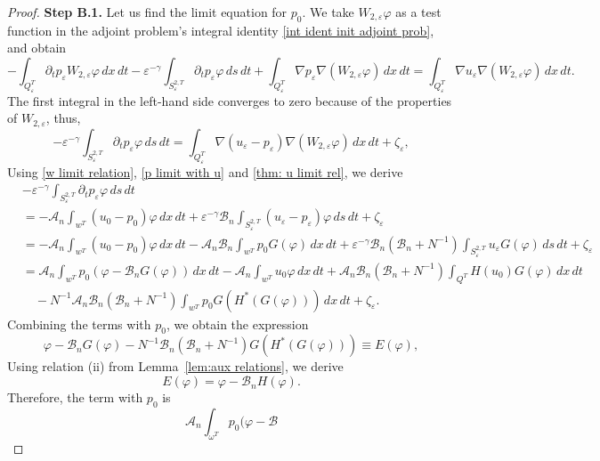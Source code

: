 \documentclass[10pt,a4paper]{amsart}
\numberwithin{equation}{section}
\begin{document}
\begin{proof}
\noindent\textbf{Step B.1.}
Let us find the limit equation for $p_0$. We take 
$W_{2,\varepsilon }\varphi $ as a test function in the adjoint problem's
integral identity \eqref{int ident init adjoint prob}, and obtain
\[
-\int _{Q_{\varepsilon }^{T}}\partial _{t}p_{\varepsilon
}W_{2,\varepsilon }\varphi \,dx\,dt-\varepsilon ^{-\gamma }\int
_{S_{\varepsilon }^{2,T}}\partial _{t}p_{\varepsilon }\varphi \,ds\,dt%
+\int _{Q_{\varepsilon }^{T}}\nabla p_{\varepsilon }\nabla
(W_{2,\varepsilon }\varphi )\,dx\,dt=\int _{Q_{\varepsilon }^{T}}\nabla
u_{\varepsilon }\nabla (W_{2,\varepsilon }\varphi )\,dx\,dt.
\]%
The first integral in the left-hand side converges to zero because of the
properties of $W_{2,\varepsilon }$, thus,
\[
-\varepsilon ^{-\gamma }\int _{S_{\varepsilon }^{2,T}}\partial
_{t}p_{\varepsilon }\varphi \,ds\,dt=\int _{Q_{\varepsilon }^{T}}\nabla
(u_{\varepsilon }-p_{\varepsilon })\nabla (W_{2,\varepsilon }\varphi )\,dx\,dt%
+\zeta _{\varepsilon },
\]
Using \eqref{w limit relation}, \eqref{p limit with u} and
\eqref{thm: u limit rel}, we derive
\begin{align*}
&-\varepsilon ^{-\gamma }\int _{S_{\varepsilon }^{2,T}}\partial
_{t}p_{\varepsilon }\varphi \,ds\,dt\\
&=-\mathcal{A}_n\int _{w^{T}}(u_0-p_0)\varphi \,dx\,dt
 +\varepsilon ^{-\gamma }\mathcal{B}_n\int _{S_{\varepsilon }^{2,T}}
 (u_{\varepsilon }-p_{\varepsilon})\varphi \,ds\,dt
 + \zeta_\varepsilon \\
&=-\mathcal{A}_n\int _{w^{T}}(u_0-p_0)\varphi \,dx\,dt-\mathcal{A}%
_n\mathcal{B}_n\int _{w^{T}}p_0G(\varphi )\,dx\,dt+\varepsilon
^{-\gamma }\mathcal{B}_n(\mathcal{B}_n+N^{-1})\int
_{S_{\varepsilon }^{2,T}}u_{\varepsilon }G(\varphi )\,ds\,dt +
\zeta_\varepsilon \\
&=\mathcal{A}_n\int _{w^{T}}p_0(\varphi -\mathcal{B}_nG(\varphi
))\,dx\,dt-\mathcal{A}_n\int _{w^{T}}u_0\varphi \,dx\,dt+\mathcal{A}%
_n\mathcal{B}_n(\mathcal{B}_n+N^{-1})\int
_{Q^{T}}H(u_0)G(\varphi )\,dx\,dt \\
&\quad -N^{-1}\mathcal{A}_n\mathcal{B}_n(\mathcal{B}_n+N^{-1})\int%
_{w^{T}}p_0G(H^{\ast }(G(\varphi )))\,dx\,dt + \zeta_\varepsilon.
\end{align*}
Combining the terms with $p_0$, we obtain the expression
\[
\varphi -\mathcal{B}_nG(\varphi )-N^{-1}\mathcal{B}_n(\mathcal{B}%
_n+N^{-1})G(H^{\ast }(G(\varphi )))\equiv E(\varphi ),
\]%
Using relation (ii) from Lemma~\ref{lem:aux relations}, we derive
\[
E(\varphi )=\varphi -\mathcal{B}_nH(\varphi ).
\]%
Therefore, the term with $p_0$ is
\[
\mathcal{A}_n\int _{\omega ^{T}}p_0(\varphi -\mathcal{B}%
\]
\end{proof}
\end{document}
